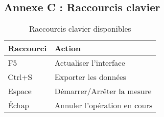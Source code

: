 \documentclass[12pt,a4paper]{article}
\begin{document}
\subsection{Annexe C : Raccourcis clavier}

\begin{table}[H]
\centering
\begin{tabular}{|l|l|}
\hline
\textbf{Raccourci} & \textbf{Action} \\
\hline
F5 & Actualiser l'interface \\
\hline
Ctrl+S & Exporter les données \\
\hline
Espace & Démarrer/Arrêter la mesure \\
\hline
Échap & Annuler l'opération en cours \\
\hline
\end{tabular}
\caption{Raccourcis clavier disponibles}
\label{tab:shortcuts}
\end{table}
\end{document}
